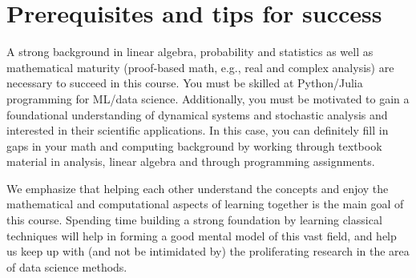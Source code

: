\documentclass[12pt]{article}
\begin{document}
\section{Prerequisites and tips for success}
A strong background in linear algebra, probability and statistics as well as mathematical maturity (proof-based math, e.g., real and complex analysis) are necessary to succeed in this course. You must be skilled at Python/Julia programming for ML/data science. Additionally, you must be motivated to gain a foundational understanding of dynamical systems and stochastic analysis and interested in their scientific applications. In this case, you can definitely fill in gaps in your math and computing background by working through textbook material in analysis, linear algebra and through programming assignments.

We emphasize that helping each other understand the concepts and enjoy the mathematical and computational aspects of learning together is the main goal of this course. Spending time building a strong foundation by learning classical techniques will help in forming a good mental model of this vast field, and help us keep up with (and not be intimidated by) the proliferating research in the area of data science methods.
\end{document}
